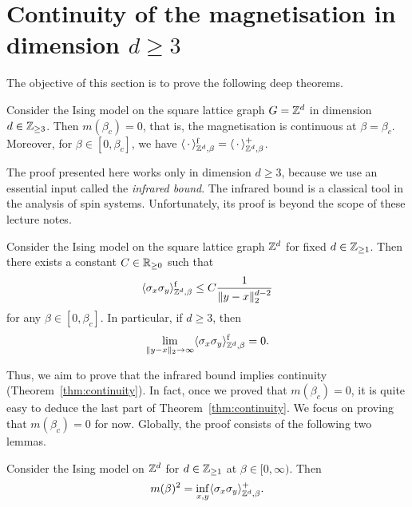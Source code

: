 \section{Continuity of the magnetisation in dimension $d\geq 3$}

The objective of this section is to prove the following deep theorems.

\begin{theorem}
    \label{thm:continuity}
    Consider the Ising model on the square lattice graph $G=\mathbb Z^d$
    in dimension $d\in\mathbb Z_{\geq 3}$.
    Then $m(\beta_c)=0$,
    that is, the magnetisation is continuous at $\beta=\beta_c$.
    Moreover, for $\beta\in[0,\beta_c]$,
    we have $\langle\,\cdot\,\rangle^{\operatorname{f}}_{\mathbb Z^d,\beta}=\langle\,\cdot\,\rangle^+_{\mathbb Z^d,\beta}$.
\end{theorem}

The proof presented here works only in dimension $d\geq 3$,
because we use an essential input called the \emph{infrared bound}.
The infrared bound is a classical tool in the analysis of spin systems.
Unfortunately, its proof is beyond the scope of these lecture notes.

\begin{theorem}
    Consider the Ising model on the square lattice graph $\mathbb Z^d$ for fixed $d\in\mathbb Z_{\geq 1}$.
    Then there exists a constant $C\in\mathbb R_{\geq 0}$ such that
    \[
        \langle\sigma_x\sigma_y\rangle_{\mathbb Z^d,\beta}^{\operatorname{f}}
        \leq C\frac1{\|y-x\|_2^{d-2}}
    \]
    for any $\beta\in[0,\beta_c]$.
    In particular, if $d\geq 3$,
    then
    \begin{equation}
        \lim_{\|y-x\|_2\to\infty}\langle\sigma_x\sigma_y\rangle_{\mathbb Z^d,\beta}^{\operatorname{f}}=0.
    \end{equation}    
\end{theorem}

Thus, we aim to prove that the infrared bound implies continuity (Theorem~\ref{thm:continuity}).
In fact, once we proved that $m(\beta_c)=0$,
it is quite easy to deduce the last part of Theorem~\ref{thm:continuity}.
We focus on proving that $m(\beta_c)=0$ for now.
Globally, the proof consists of the following two lemmas.

\begin{lemma}
    Consider the Ising model on $\mathbb Z^d$ for $d\in\mathbb Z_{\geq 1}$ at $\beta\in[0,\infty)$.
    Then
    \[
        m(\beta)^2=\inf_{x,y}\langle\sigma_x\sigma_y\rangle_{\mathbb Z^d,\beta}^+.
    \]
\end{lemma}

